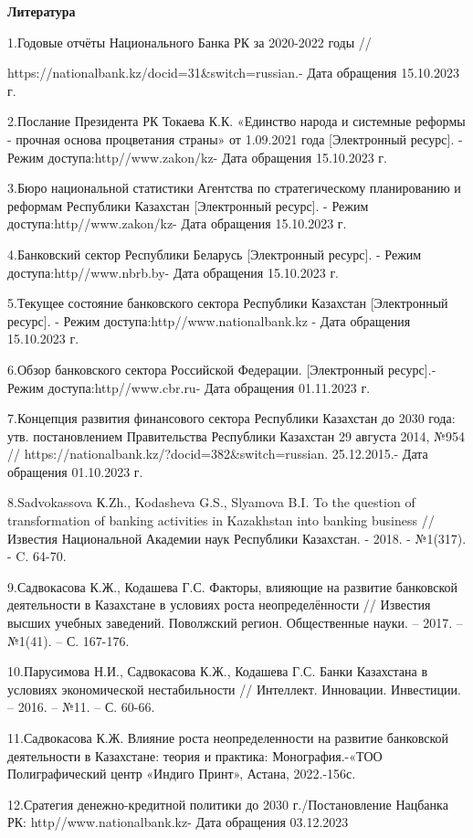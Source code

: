 \begin{center}
{\bfseries Литература}
\end{center}

\begin{noparindent}
1.Годовые отчёты Национального Банка РК за 2020-2022 годы //

https://nationalbank.kz/docid=31\&switch=russian.- Дата обращения
15.10.2023 г.

2.Послание Президента РК Токаева К.К. «Единство народа и системные
реформы - прочная основа процветания страны» от 1.09.2021 года
{[}Электронный ресурс{]}. - Режим доступа:http//www.zakon/kz- Дата
обращения 15.10.2023 г.

3.Бюро национальной статистики Агентства по стратегическому планированию
и реформам Республики Казахстан {[}Электронный ресурс{]}. - Режим
доступа:http//www.zakon/kz- Дата обращения 15.10.2023 г.

4.Банковский сектор Республики Беларусь {[}Электронный ресурс{]}. -
Режим доступа:http//www.nbrb.by- Дата обращения 15.10.2023 г.

5.Текущее состояние банковского сектора Республики Казахстан
{[}Электронный ресурс{]}. - Режим доступа:http//www.nationalbank.kz -
Дата обращения 15.10.2023 г.

6.Обзор банковского сектора Российской Федерации. {[}Электронный
ресурс{]}.- Режим доступа:http//www.cbr.ru- Дата обращения 01.11.2023 г.

7.Концепция развития финансового сектора Республики Казахстан до 2030
года: утв. постановлением Правительства Республики Казахстан 29 августа
2014, №954 // https://nationalbank.kz/?docid=382\&switch=russian.
25.12.2015.- Дата обращения 01.10.2023 г.

8.Sadvokassova К.Zh., Kodasheva G.S., Slyamova B.I. To the question of
transformation of banking activities in Kazakhstan into banking business
// Известия Национальной Академии наук Республики Казахстан. - 2018. -
№1(317). - C. 64-70.

9.Садвокасова К.Ж., Кодашева Г.С. Факторы, влияющие на развитие
банковской деятельности в Казахстане в условиях роста неопределённости
// Известия высших учебных заведений. Поволжский регион. Общественные
науки. -- 2017. -- №1(41). -- С. 167-176.

10.Парусимова Н.И., Садвокасова К.Ж., Кодашева Г.С. Банки Казахстана в
условиях экономической нестабильности // Интеллект. Инновации.
Инвестиции. -- 2016. -- №11. -- С. 60-66.

11.Садвокасова К.Ж. Влияние роста неопределенности на развитие
банковской деятельности в Казахстане: теория и практика:
Монография.-«ТОО Полиграфический центр «Индиго Принт», Астана,
2022.-156с.

12.Сратегия денежно-кредитной политики до 2030 г./Постановление Нацбанка
РК: http//www.nationalbank.kz- Дата обращения 03.12.2023
\end{noparindent}

